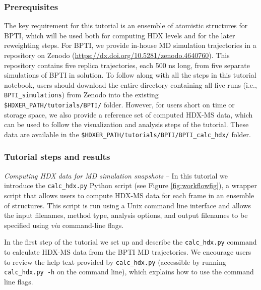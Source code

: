 \documentclass[9pt,tutorial,ASAPversion]{livecoms}
\begin{document}
\subsubsection{Prerequisites} 
The key requirement for this tutorial is an ensemble of atomistic structures for BPTI, which will be used both for computing HDX levels and for the later reweighting steps. 
For BPTI, we provide in-house MD simulation trajectories in a repository on Zenodo (\url{https://dx.doi.org/10.5281/zenodo.4640760}). 
This repository contains five replica trajectories, each 500 ns long, from five separate simulations of BPTI in solution. 
To follow along with all the steps in this tutorial notebook, users should download the entire directory containing all five runs (i.e., \texttt{BPTI\_simulations}) from Zenodo into the existing \texttt{\$HDXER\_PATH/tutorials/BPTI/} folder. 
However, for users short on time or storage space, we also provide a reference set of computed HDX-MS data, which can be used to follow the visualization and analysis steps of the tutorial. 
These data are available in the \texttt{\$HDXER\_PATH/tutorials/BPTI/BPTI\_calc\_hdx/} folder. 

\subsubsection{Tutorial steps and results}\label{calc_hdx_py_sect}

\noindent
\textit{Computing HDX data for MD simulation snapshots} -- In this tutorial we introduce the \texttt{calc\_hdx.py} Python script (see Figure \ref{fig:workflowfig}), a wrapper script that allows users to compute HDX-MS data for each frame in an ensemble of structures. 
This script is run using a Unix command line interface and allows the input filenames, method type, analysis options, and output filenames to be specified using \textit{via} command-line flags.

In the first step of the tutorial we set up and describe the \texttt{calc\_hdx.py} command to calculate HDX-MS data from the BPTI MD trajectories.
We encourage users to review the help text provided by \texttt{calc\_hdx.py} (accessible by running \texttt{calc\_hdx.py -h} on the command line), which explains how to use the command line flags.
\end{document}
